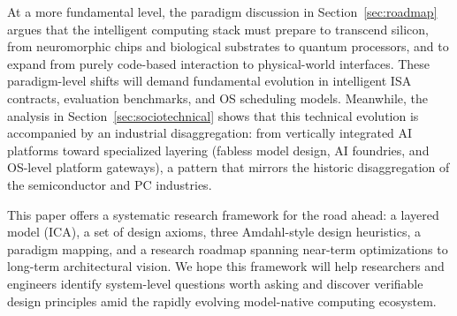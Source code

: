 At a more fundamental level, the paradigm discussion in Section~\ref{sec:roadmap} argues that the intelligent computing stack must prepare to transcend silicon, from neuromorphic chips and biological substrates to quantum processors, and to expand from purely code-based interaction to physical-world interfaces. These paradigm-level shifts will demand fundamental evolution in intelligent ISA contracts, evaluation benchmarks, and OS scheduling models. Meanwhile, the analysis in Section~\ref{sec:sociotechnical} shows that this technical evolution is accompanied by an industrial disaggregation: from vertically integrated AI platforms toward specialized layering (fabless model design, AI foundries, and OS-level platform gateways), a pattern that mirrors the historic disaggregation of the semiconductor and PC industries.

This paper offers a systematic research framework for the road ahead: a layered model (ICA), a set of design axioms, three Amdahl-style design heuristics, a paradigm mapping, and a research roadmap spanning near-term optimizations to long-term architectural vision. We hope this framework will help researchers and engineers identify system-level questions worth asking and discover verifiable design principles amid the rapidly evolving model-native computing ecosystem.
